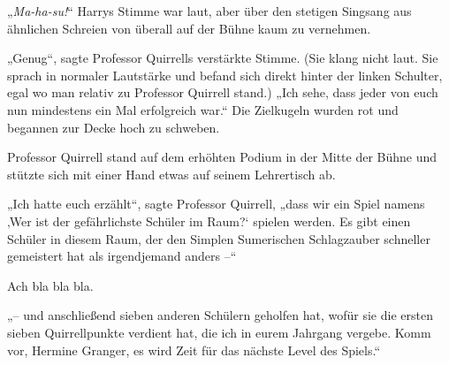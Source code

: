 „\emph{Ma-ha-su!}“ Harrys Stimme war laut, aber über den stetigen Singsang aus ähnlichen Schreien von überall auf der Bühne kaum zu vernehmen.

„Genug“, sagte Professor Quirrells verstärkte Stimme. (Sie klang nicht laut. Sie sprach in normaler Lautstärke und befand sich direkt hinter der linken Schulter, egal wo man relativ zu Professor Quirrell stand.) „Ich sehe, dass jeder von euch nun mindestens ein Mal erfolgreich war.“ Die Zielkugeln wurden rot und begannen zur Decke hoch zu schweben.

Professor Quirrell stand auf dem erhöhten Podium in der Mitte der Bühne und stützte sich mit einer Hand etwas auf seinem Lehrertisch ab.

„Ich hatte euch erzählt“, sagte Professor Quirrell, „dass wir ein Spiel namens ‚Wer ist der gefährlichste Schüler im Raum?‘ spielen werden. Es gibt einen Schüler in diesem Raum, der den Simplen Sumerischen Schlagzauber schneller gemeistert hat als irgendjemand anders –“

Ach bla bla bla.

„– und anschließend sieben anderen Schülern geholfen hat, wofür sie die ersten sieben Quirrellpunkte verdient hat, die ich in eurem Jahrgang vergebe. Komm vor, Hermine Granger, es wird Zeit für das nächste Level des Spiels.“

